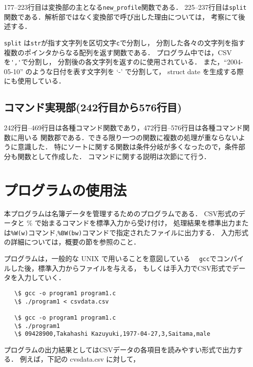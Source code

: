 \documentclass[a4paper,11pt]{jarticle}
\begin{document}
177--223行目は変換部の主となる\verb|new_profile|関数である．
225--237行目は\verb|split|関数である．解析部ではなく変換部で呼び出した理由については，
考察にて後述する．

\verb|split| は\verb|str|が指す文字列を区切文字\verb|c|で分割し，
分割した各々の文字列を指す複数のポインタからなる配列を返す関数である．
プログラム中では，CSVを\verb|','|で分割し，
分割後の各文字列を返すのに使用されている．
また，``2004-05-10'' のような日付を表す文字列を `-' で分割して，
struct date を生成する際にも使用している．

\subsection{コマンド実現部(242行目から576行目)}

242行目--469行目は各種コマンド関数であり，472行目--576行目は各種コマンド関数に用いる
関数郡である．できる限り一つの関数に複数の処理が重ならないように意識した．
特にソートに関する関数は条件分岐が多くなったので，条件部分も関数として作成した．
コマンドに関する説明は次節にて行う．
\section{プログラムの使用法}

本プログラムは名簿データを管理するためのプログラムである．
CSV形式のデータと \% で始まるコマンドを標準入力から受け付け，
処理結果を標準出力または\verb|%W(w)|コマンド,\verb|%BW(bw)|コマンドで指定されたファイルに出力する．
入力形式の詳細については，概要の節を参照のこと．

プログラムは，一般的な UNIX で用いることを意図している　
\verb|gcc|でコンパイルした後，標準入力からファイルを与える，
もしくは手入力でCSV形式でデータを入力していく．

{\fontsize{10pt}{11pt} \selectfont
 \begin{verbatim}
   \$ gcc -o program1 program1.c
   \$ ./program1 < csvdata.csv

   \$ gcc -o program1 program1.c
   \$ ./program1
   \$ 09428900,Takahashi Kazuyuki,1977-04-27,3,Saitama,male
 \end{verbatim}
}

プログラムの出力結果としてはCSVデータの各項目を読みやすい形式で出力する．
例えば，下記の cvsdata.csv に対して，
\end{document}
